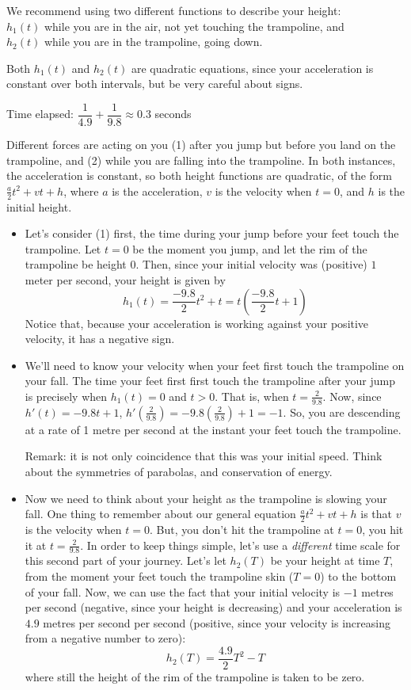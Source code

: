 \begin{hint}
We recommend using two different functions to describe your height:\\
$h_1(t)$ while you are in the air, not yet touching the trampoline, and\\
$h_2(t)$ while you are in the trampoline, going down.

Both $h_1(t)$ and $h_2(t)$ are quadratic equations, since your acceleration is constant over both intervals, but be very careful about signs.
\end{hint}
\begin{answer}
Time elapsed: $\dfrac{1}{4.9}+\dfrac{1}{9.8}\approx 0.3$ seconds
\end{answer}
\begin{solution}
Different forces are acting on you  (1) after you jump but before you land on the trampoline, and (2) while you are falling into the trampoline. In both instances, the acceleration is constant, so both height functions are quadratic, of the form $\frac{a}{2}t^2+vt+h$, where $a$ is the acceleration, $v$ is the velocity when $t=0$, and $h$ is the initial height.
\begin{itemize}
\item
Let's consider (1) first, the time during your jump before your feet touch the trampoline. Let $t=0$ be the moment you jump, and  let the rim of the trampoline be height $0$. Then, since your initial velocity was (positive) $1$ meter per second, your height is given by
\[h_1(t)=\frac{-9.8}{2}t^2+t=t\left(\frac{-9.8}{2}t+1\right)\]
Notice that, because your acceleration is working against your positive velocity, it has a negative sign.
\item
We'll need to know your velocity when your feet first touch the trampoline on your fall. The time your feet first first touch the trampoline after your jump is precisely when $h_1(t)=0$ and $t>0$. That is, when $t=\frac{2}{9.8}$. Now, since $h'(t)=-9.8t+1$, $h'\left(\frac{2}{9.8}\right)=-9.8\left(\frac{2}{9.8}\right)+1=-1$. So, you are descending at a rate of 1 metre per second at the instant your feet touch the trampoline.

Remark: it is not only coincidence that this was your initial speed. Think about the symmetries of parabolas, and conservation of energy.
\item
Now we need to think about your height as the trampoline is slowing your fall. One thing to remember about our general equation $\frac{a}{2}t^2+vt+h$ is that $v$ is the velocity when $t=0$. But, you don't hit the trampoline at $t=0$, you hit it at $t=\frac{2}{9.8}$. In order to keep things simple, let's use a \emph{different} time scale for this second part of your journey. Let's let $h_2(T)$ be your height at time $T$, from the moment your feet touch the trampoline skin ($T=0$) to the bottom of your fall. Now, we can use the fact that your initial velocity is $-1$ metres per second (negative, since your height is decreasing) and your acceleration is $4.9$ metres per second per second (positive, since your velocity is increasing from a negative number to zero):
\[h_2(T)=\frac{4.9}{2}T^2-T\]
where still the height of the rim of the trampoline is taken to be zero.


\end{itemize}
\end{solution}
